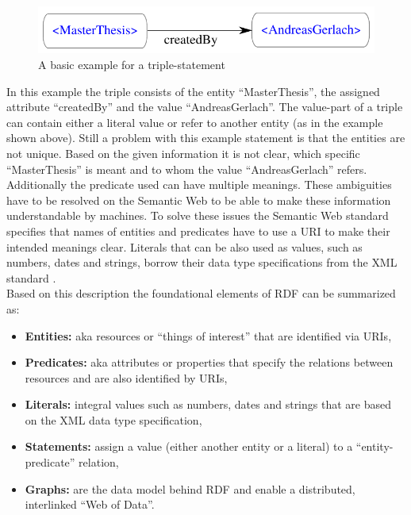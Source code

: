 \begin{figure}[H]
	\centering
		\includegraphics[width=0.8\columnwidth]{images/sample_triple.pdf}
	\caption{A basic example for a triple-statement}
\label{fig:images_semweb_triple}
\end{figure}

In this example the triple consists of the entity ``MasterThesis'', the assigned attribute ``createdBy'' and the value ``AndreasGerlach''. The value-part of a triple can contain either a literal value or refer to another entity (as in the example shown above). Still a problem with this example statement is that the entities are not unique. Based on the given information it is not clear, which specific ``MasterThesis'' is meant and to whom the value ``AndreasGerlach'' refers. Additionally the predicate used can have multiple meanings. These ambiguities have to be resolved on the Semantic Web to be able to make these information understandable by machines. To solve these issues the Semantic Web standard specifies that names of entities and predicates have to use a \gls{URI} to make their intended meanings clear. Literals that can be also used as values, such as numbers, dates and strings, borrow their data type specifications from the \gls{XML} standard \citep[pg. 15-38]{wood2014linked}. \\

Based on this description the foundational elements of \gls{RDF} can be summarized as: \@

\begin{itemize}
	\item \textbf{Entities:} aka resources or ``things of interest'' that are identified via \gls{URI}s,
	\item \textbf{Predicates:} aka attributes or properties that specify the relations between resources and are also identified by \gls{URI}s,
	\item \textbf{Literals:} integral values such as numbers, dates and strings that are based on the \gls{XML} data type specification,
	\item \textbf{Statements:} assign a value (either another entity or a literal) to a ``entity-predicate'' relation,
	\item \textbf{Graphs:} are the data model behind \gls{RDF} and enable a  distributed, interlinked ``Web of Data''.
\end{itemize}

